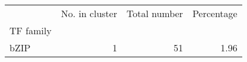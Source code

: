 \begin{tabular}{lrrr}
\toprule
{} &  No. in cluster &  Total number &  Percentage \\
TF family &                 &               &             \\
\midrule
bZIP      &               1 &            51 &        1.96 \\
\bottomrule
\end{tabular}
